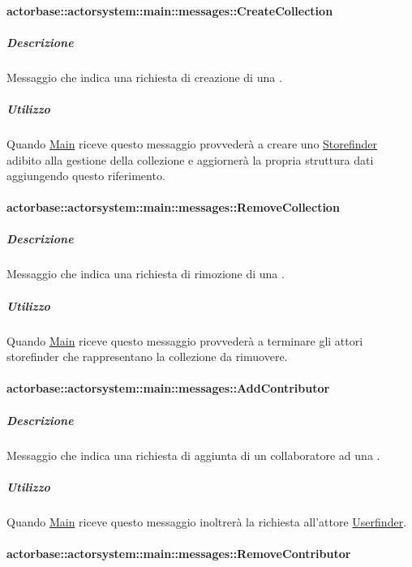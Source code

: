 \documentclass{scalatekids-article}
\begin{document}
\paragraph{actorbase::actorsystem::main::messages::CreateCollection}
\label{sec:actorbase::actorsystem::main::messages::CreateCollection}

\subparagraph{Descrizione}
Messaggio che indica una richiesta di creazione di una .

\subparagraph{Utilizzo}
Quando \hyperref[sec:actorbase::actorsystem::main::Main]{Main}
riceve questo messaggio provvederà a creare uno \hyperref[sec:actorbase::actorsystem::storefinder::Storefinder]{Storefinder} adibito
alla gestione della collezione e aggiornerà la propria struttura dati
aggiungendo questo riferimento.

\paragraph{actorbase::actorsystem::main::messages::RemoveCollection}
\label{sec:actorbase::actorsystem::main::messages::RemoveCollection}

\subparagraph{Descrizione}
Messaggio che indica una richiesta di rimozione di una .

\subparagraph{Utilizzo}
Quando \hyperref[sec:actorbase::actorsystem::main::Main]{Main}
riceve questo messaggio provvederà a terminare gli attori storefinder
che rappresentano la collezione da rimuovere.

\paragraph{actorbase::actorsystem::main::messages::AddContributor}
\label{sec:actorbase::actorsystem::main::messages::AddContributor}

\subparagraph{Descrizione}

Messaggio che indica una richiesta di aggiunta di un collaboratore ad una
.

\subparagraph{Utilizzo}

Quando \hyperref[sec:actorbase::actorsystem::main::Main]{Main}
riceve questo messaggio inoltrerà la richiesta all'attore
\hyperref[sec:actorbase::actorsystem::userfinder::Userfinder]{Userfinder}.

\paragraph{actorbase::actorsystem::main::messages::RemoveContributor}
\label{sec:actorbase::actorsystem::main::messages::RemoveContributor}
\end{document}
